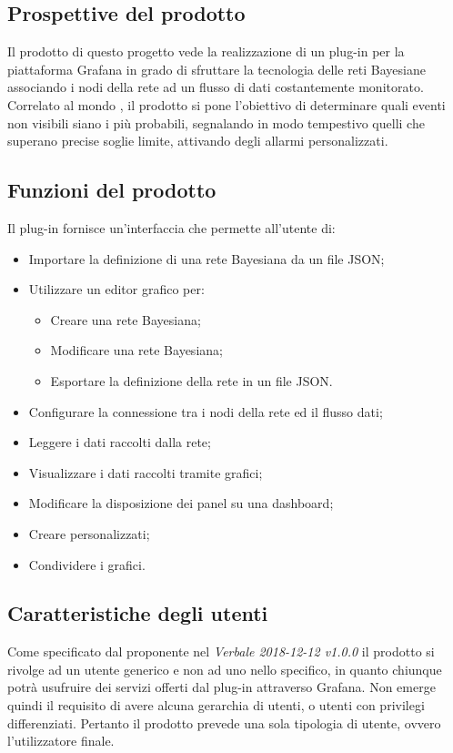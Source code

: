 
\subsection{Prospettive del prodotto}
Il prodotto di questo progetto vede la realizzazione di un plug-in per la piattaforma Grafana in grado di sfruttare la tecnologia delle reti Bayesiane associando i nodi della rete ad un flusso di dati costantemente monitorato. Correlato al mondo , il prodotto si pone l'obiettivo di  determinare quali eventi non visibili siano i più probabili, segnalando in modo tempestivo quelli che superano precise soglie limite, attivando degli allarmi personalizzati. 

\subsection{Funzioni del prodotto}
Il plug-in fornisce un'interfaccia che permette all'utente di:

\begin{itemize}
	\item Importare la definizione di una rete Bayesiana da un file JSON;
	\item Utilizzare un editor grafico per:
	\begin{itemize}
		\item Creare una rete Bayesiana;
		\item Modificare una rete Bayesiana;
		\item Esportare la definizione della rete in un file JSON.
	\end{itemize} 
	\item Configurare la connessione tra i nodi della rete ed il flusso dati;
	\item Leggere i dati raccolti dalla rete;
	\item Visualizzare i dati raccolti tramite grafici;
	\item Modificare la disposizione dei panel su una dashboard;
	\item Creare  personalizzati;
	\item Condividere i grafici.
\end{itemize}

\subsection{Caratteristiche degli utenti}
Come specificato dal proponente nel \emph{Verbale 2018-12-12 v1.0.0} il prodotto si rivolge ad un utente generico e non ad uno nello specifico, in quanto chiunque potrà usufruire dei servizi offerti dal plug-in attraverso Grafana. Non emerge quindi il requisito di avere alcuna gerarchia di utenti, o utenti con privilegi differenziati. Pertanto il prodotto prevede una sola tipologia di utente, ovvero l’utilizzatore finale.

